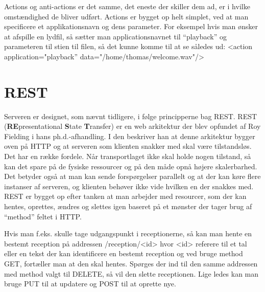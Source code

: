 Actions og anti-actions er det samme, det eneste der skiller dem ad, er i hvilke omstændighed de bliver udført. Actions er bygget op helt simplet, ved at man specificere et applikationsnavn og dens parameter. For eksempel hvis man ønsker at afspille en lydfil, så sætter man applicationsnavnet til \enquote{playback} og parameteren til stien til filen, så det kunne komme til at se således ud: \linebreak <action application="playback'' data="/home/thomas/welcome.wav"/>

\section{REST}
\label{sec:rest}
Serveren er designet, som nævnt tidligere, i følge principperne bag REST. \linebreak
REST (\textbf{RE}presentational \textbf{S}tate \textbf{T}ransfer) er en web arkitektur der blev opfundet af Roy Fielding i hans ph.d.-afhandling. I den beskriver han at denne arkitektur bygger oven på HTTP og at serveren som klienten snakker med skal være tilstandsløs. Det har en række fordele. Når transportlaget ikke skal holde nogen tilstand, så kan det spare på de fysiske ressourcer og på den måde opnå højere skalerbarhed. Det betyder også at man kan sende forspørgelser parallelt og at der kan køre flere instanser af serveren, og klienten behøver ikke vide hvilken en der snakkes med.
REST er bygget op efter tanken at man arbejder med resourcer, som der kan hentes, oprettes, ændres og slettes igen baseret på et mønster der tager brug af \enquote{method} feltet i HTTP.

Hvis man f.eks. skulle tage udgangspunkt i receptionerne, så kan man hente en bestemt reception på addressen /reception/<id> hvor <id> referere til et tal eller en tekst der kan identificere en bestemt reception og ved bruge method GET, fortæller man at den skal hentes. Spørges der ind til den samme addressen med method valgt til DELETE, så vil den slette receptionen. Lige ledes kan man bruge PUT til at updatere og POST til at oprette nye.
